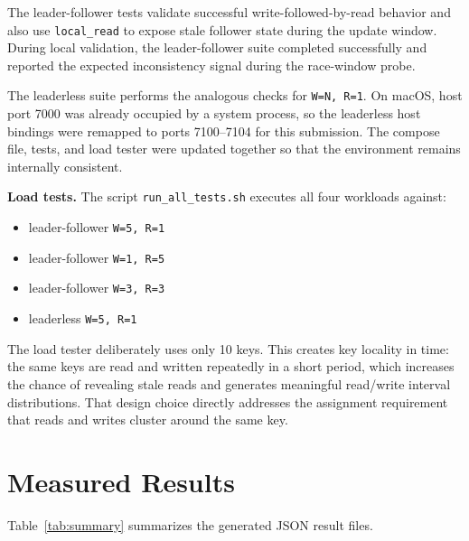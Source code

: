 \documentclass[11pt]{article}
\begin{document}
The leader-follower tests validate successful write-followed-by-read behavior and also use \texttt{local\_read} to expose stale follower state during the update window. During local validation, the leader-follower suite completed successfully and reported the expected inconsistency signal during the race-window probe.

The leaderless suite performs the analogous checks for \texttt{W=N, R=1}. On macOS, host port 7000 was already occupied by a system process, so the leaderless host bindings were remapped to ports 7100--7104 for this submission. The compose file, tests, and load tester were updated together so that the environment remains internally consistent.

\textbf{Load tests.} The script \texttt{run\_all\_tests.sh} executes all four workloads against:
\begin{itemize}
\item leader-follower \texttt{W=5, R=1}
\item leader-follower \texttt{W=1, R=5}
\item leader-follower \texttt{W=3, R=3}
\item leaderless \texttt{W=5, R=1}
\end{itemize}

The load tester deliberately uses only 10 keys. This creates key locality in time: the same keys are read and written repeatedly in a short period, which increases the chance of revealing stale reads and generates meaningful read/write interval distributions. That design choice directly addresses the assignment requirement that reads and writes cluster around the same key.

\section{Measured Results}

Table~\ref{tab:summary} summarizes the generated JSON result files.
\end{document}
